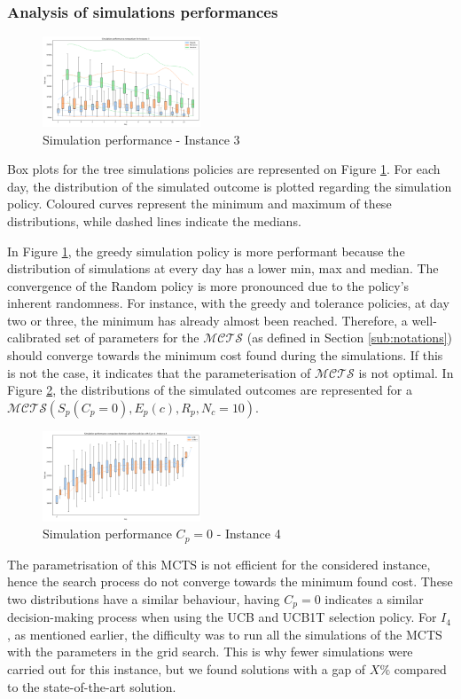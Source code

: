 \documentclass[conference]{IEEEtran}
\begin{document}
\subsubsection*{Analysis of simulations performances}
\begin{figure}[!ht]
    \centering
    \includegraphics[width=0.42\textwidth]{Figures/3 - Simulation performance.png}
    \caption{Simulation performance - Instance 3}
    \label{fig:sim_perf_3}
\end{figure}
Box plots for the tree simulations policies are represented on Figure \ref{fig:sim_perf_3}. For each day, the distribution of the simulated outcome is plotted regarding the simulation policy. Coloured curves represent the minimum and maximum of these distributions, while dashed lines indicate the medians.

In Figure \ref{fig:sim_perf_3}, the greedy simulation policy is more performant because the distribution of simulations at every day has a lower min, max and median.
The convergence of the Random policy is more pronounced due to the policy's inherent randomness. For instance, with the greedy and tolerance policies, at day two or three, the minimum has already almost been reached. Therefore, a well-calibrated set of parameters for the $\mathcal{MCTS}$ (as defined in Section \ref{sub:notations}) should converge towards the minimum cost found during the simulations. If this is not the case, it indicates that the parameterisation of $\mathcal{MCTS}$ is not optimal. In Figure \ref{fig:sim_perf_4_cp_zero}, the distributions of the simulated outcomes are represented for a  $\mathcal{MCTS}(S_p(C_p=0),E_p(c),R_p,N_c=10)$.


\begin{figure}[!ht]
    \centering
    \includegraphics[width=0.42\textwidth]{Figures/4 - Simulation performance - CP=0.png}
    \caption{Simulation performance $C_p=0$ - Instance 4}
    \label{fig:sim_perf_4_cp_zero}
\end{figure}
The parametrisation of this MCTS is not efficient for the considered instance, hence the search process do not converge towards the minimum found cost. These two distributions have a similar behaviour, having $C_p=0$ indicates a similar decision-making process when using the UCB and UCB1T selection policy.
For $I_4$, as mentioned earlier, the difficulty was to run all the simulations of the MCTS with the parameters in the grid search. This is why fewer simulations were carried out for this instance, but we found solutions with a gap of $X\%$ compared to the state-of-the-art solution.
\end{document}
